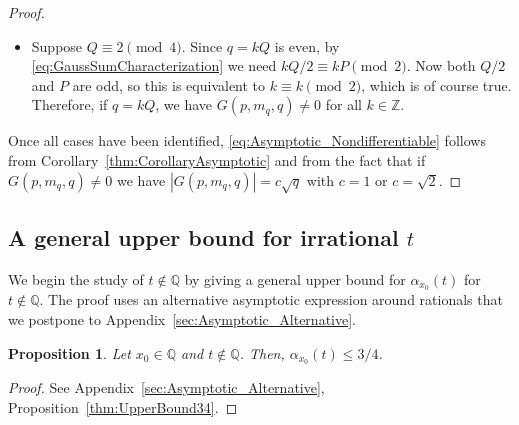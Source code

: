 \documentclass[11pt,reqno]{amsart}
\newtheorem{prop}[thm]{Proposition}
\theoremstyle{definition}
\begin{document}
\begin{proof}
\begin{itemize}
	\item Suppose  $Q \equiv 2 \pmod{4}$. Since $q = kQ$ is even, by \eqref{eq:GaussSumCharacterization} we need $kQ/2 \equiv kP \pmod{2}$. Now both $Q/2$ and $P$ are odd, so this is equivalent to $k \equiv k \pmod{2}$, which is of course true. 
	Therefore, if $q = kQ$, we have $G(p,m_q,q) \neq 0$ for all $k \in \mathbb Z$. 
\end{itemize}

Once  all cases have been identified, \eqref{eq:Asymptotic_Nondifferentiable} follows from Corollary~\ref{thm:CorollaryAsymptotic}
and from the fact that if $G(p,m_q,q) \neq 0$ we have $|G(p,m_q,q)| = c\sqrt{q}$ with $c = 1$ or $c = \sqrt{2}$. 
\end{proof}


\subsection{A general upper bound for irrational $t$}
We begin the study of $t \not\in \mathbb Q$ by giving a general upper bound for $\alpha_{x_0}(t)$ for $t \not\in \mathbb Q$.
The proof uses an alternative asymptotic expression around rationals that we postpone to Appendix~\ref{sec:Asymptotic_Alternative}.  
\begin{prop}\label{thm:UpperBound34MainText}
Let $x_0 \in \mathbb Q$ and $t \not\in \mathbb Q$. Then, $\alpha_{x_0}(t) \leq  3/4$. 
\end{prop}
\begin{proof}
See Appendix~\ref{sec:Asymptotic_Alternative}, Proposition~\ref{thm:UpperBound34}. 
\end{proof}
\end{document}
